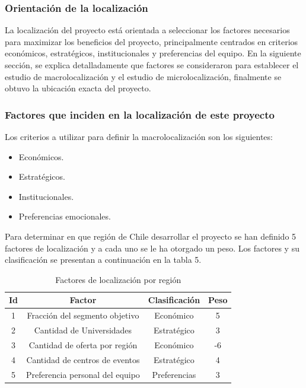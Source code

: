 \subsubsection{Orientación de la localización}
La localización del proyecto está orientada a seleccionar los factores necesarios 
para maximizar los beneficios del proyecto, principalmente centrados en 
criterios económicos, estratégicos, institucionales y preferencias del equipo.
En la siguiente sección, se explica detalladamente que factores se consideraron
para establecer el estudio de macrolocalización y el estudio de microlocalización,
finalmente se obtuvo la ubicación exacta del proyecto.

\subsubsection{Factores que inciden en la localización de este proyecto}
Los criterios a utilizar para definir la macrolocalización son los siguientes:
\begin{itemize}
	\item Económicos.
	\item Estratégicos.
	\item Institucionales.
	\item Preferencias emocionales.
\end{itemize}

Para determinar en que región de Chile desarrollar el proyecto se han definido
5 factores de localización y a cada uno se le ha otorgado un peso.
Los factores y su clasificación se presentan a continuación en la tabla 5.

\begin{table}[h]
\centering
	\begin{tabular}{|c|c|c|c|}
		\hline
		\textbf{Id} & \textbf{Factor} & 
		\textbf{Clasificación} & \textbf{Peso} \\
		\hline
		1      & Fracción del segmento objetivo  & Económico    & 5 \\
		\hline
		2      & Cantidad de Universidades       & Estratégico  & 3 \\
		\hline
		3      & Cantidad de oferta por región   & Económico    & -6 \\
		\hline
		4      & Cantidad de centros de eventos  & Estratégico  & 4 \\
		\hline
		5      & Preferencia personal del equipo & Preferencias & 3 \\
		\hline
	\end{tabular}
\caption{Factores de localización por región}
\label{tab:macrolocalizacion}
\end{table}
%


